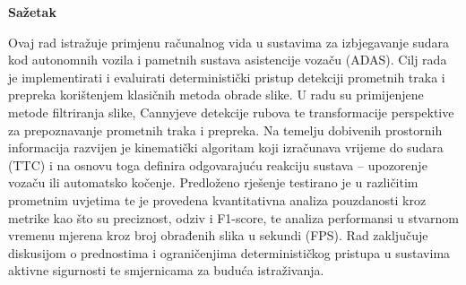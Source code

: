 \documentclass[12pt, a4paper]{report}
\begin{document}
\newpage
\thispagestyle{empty}
{}
\null\vfill
\begin{center}
    {\Large\bfseries Sažetak\par}
    \vspace{1cm}
    \begin{minipage}{0.9\textwidth}
        Ovaj rad istražuje primjenu računalnog vida u sustavima za izbjegavanje sudara kod autonomnih vozila i pametnih sustava asistencije vozaču (ADAS). Cilj rada je implementirati i evaluirati deterministički pristup detekciji prometnih traka i prepreka korištenjem klasičnih metoda obrade slike.
        U radu su primijenjene metode filtriranja slike, Cannyjeve detekcije rubova te transformacije perspektive za prepoznavanje prometnih traka i prepreka. Na temelju dobivenih prostornih informacija razvijen je kinematički algoritam koji izračunava vrijeme do sudara (TTC) i na osnovu toga definira odgovarajuću reakciju sustava -- upozorenje vozaču ili automatsko kočenje.
        Predloženo rješenje testirano je u različitim prometnim uvjetima te je provedena kvantitativna analiza pouzdanosti kroz metrike kao što su preciznost, odziv i F1-score, te analiza performansi u stvarnom vremenu mjerena kroz broj obrađenih slika u sekundi (FPS).
        Rad zaključuje diskusijom o prednostima i ograničenjima determinističkog pristupa u sustavima aktivne sigurnosti te smjernicama za buduća istraživanja.
    \end{minipage}
\end{center}
\vfill\null
\end{document}
